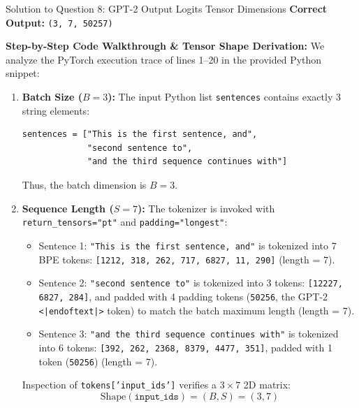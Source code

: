 \documentclass[11pt,a4paper]{article}
\begin{document}
\begin{solutionbox}{Solution to Question 8: GPT-2 Output Logits Tensor Dimensions}
\textbf{Correct Output:} \texttt{(3, 7, 50257)}

\medskip
\noindent
\textbf{Step-by-Step Code Walkthrough \& Tensor Shape Derivation:}
We analyze the PyTorch execution trace of lines 1--20 in the provided Python snippet:

\begin{enumerate}[leftmargin=1.5em]
    \item \textbf{Batch Size ($B = 3$):}
    The input Python list \texttt{sentences} contains exactly 3 string elements:
    \begin{lstlisting}[style=pythonstyle, numbers=none]
sentences = ["This is the first sentence, and",
             "second sentence to",
             "and the third sequence continues with"]
    \end{lstlisting}
    Thus, the batch dimension is $B = 3$.

    \item \textbf{Sequence Length ($S = 7$):}
    The tokenizer is invoked with \texttt{return\_tensors="pt"} and \texttt{padding="longest"}:
    \begin{itemize}[leftmargin=1.5em]
        \item Sentence 1: \texttt{"This is the first sentence, and"} is tokenized into 7 BPE tokens:
        \texttt{[1212, 318, 262, 717, 6827, 11, 290]} (length = 7).
        \item Sentence 2: \texttt{"second sentence to"} is tokenized into 3 tokens: \texttt{[12227, 6827, 284]}, and padded with 4 padding tokens (\texttt{50256}, the GPT-2 \texttt{<|endoftext|>} token) to match the batch maximum length (length = 7).
        \item Sentence 3: \texttt{"and the third sequence continues with"} is tokenized into 6 tokens: \texttt{[392, 262, 2368, 8379, 4477, 351]}, padded with 1 token (\texttt{50256}) (length = 7).
    \end{itemize}
    Inspection of \texttt{tokens['input\_ids']} verifies a $3 \times 7$ 2D matrix:
    \begin{equation*}
        \text{Shape}(\texttt{input\_ids}) = (B, S) = (3, 7)
    \end{equation*}


\end{enumerate}
\end{solutionbox}
\end{document}
